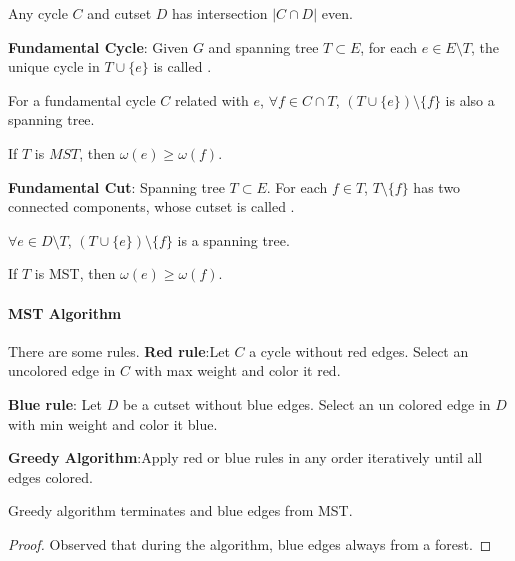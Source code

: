 
\begin{claim}
    Any cycle  $ C $ and cutset $ D $ has intersection  $ |C\cap D| $ even.   
\end{claim}

\textbf{Fundamental Cycle}: Given  $ G $ and spanning tree  $ T\subset E $, for each  $ e\in E\setminus T $, the unique cycle in  $ T\cup\{e\} $ is called .

\begin{claim}
    For a fundamental cycle  $ C $ related with  $ e $, $ \forall f\in C\cap T $,  $ (T\cup \{e\})\setminus\{f\} $ is  also a spanning tree.
\end{claim}
If  $ T  $ is  $ MST $, then  $ \omega(e) \geq \omega(f) $.  


\textbf{Fundamental Cut}: Spanning tree  $ T\subset E $. For each  $ f\in T $,  $ T\setminus\{f\} $   has two connected components, whose cutset is called .

\begin{claim}
    $ \forall e\in D\setminus T $,  $ (T\cup\{e\})\setminus\{f\} $ is  a spanning tree. 
\end{claim}
If  $ T  $ is MST, then  $ \omega(e) \geq \omega(f) $.

\paragraph{MST Algorithm}
There are some rules.
\textbf{Red rule}:Let  $ C  $ a cycle without red edges. Select an uncolored edge in  $ C   $ with max weight and color it red.

\textbf{Blue rule}: Let  $ D  $ be a cutset without blue edges. Select an un  colored edge in  $ D $ with min weight and color it blue.

\textbf{Greedy Algorithm}:Apply red or blue rules in any order iteratively until all edges colored.

\begin{theorem}
    Greedy algorithm terminates and  blue edges from MST.
\end{theorem}
\begin{proof}
    Observed that during the algorithm, blue edges always from a forest.
\end{proof}


